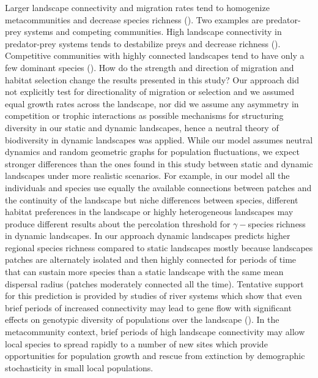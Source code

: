 \documentclass[12pt]{article}
\begin{document}
Larger landscape connectivity and migration rates tend to homogenize metacommunities and decrease species richness (\cite{ellneretal2001, foxetal2011}). Two examples are predator-prey systems and competing communities. High landscape connectivity in predator-prey systems tends to destabilize preys and decrease richness (\cite{ellneretal2001, foxetal2011}). Competitive communities with highly connected landscapes tend to have only a few dominant species (\cite{Holyoaketal2005}). How do the strength and direction of migration and habitat selection change the results presented in this study? Our approach did not explicitly test for directionality of migration or selection and we assumed equal growth rates across the landscape, nor did we assume any asymmetry in competition or trophic interactions as possible mechanisms for structuring diversity in our static and dynamic landscapes, hence a neutral theory of biodiversity in dynamic landscapes was applied. While our model assumes neutral dynamics and random geometric graphs for population fluctuations, we expect stronger differences than the ones found in this study between static and dynamic landscapes under more realistic scenarios. For example, in our model all the individuals and species use equally the available connections between patches and the continuity of the landscape but niche differences between species, different habitat preferences in the landscape or highly heterogeneous landscapes may produce different results about the percolation threshold for $\gamma-$species richness in dynamic landscapes. In our approach dynamic landscapes predicts higher regional species richness compared to static landscapes mostly because landscapes patches are alternately isolated and then highly connected for periods of time that can sustain more species than a static landscape with the same mean dispersal radius (patches moderately connected all the time). Tentative support for this prediction is provided by studies of river systems which show that even brief periods of increased connectivity may lead to gene flow with significant effects on genotypic diversity of populations over the landscape (\cite{BoizardEtAl2009}). In the metacommunity context, brief periods of high landscape connectivity may allow local species to spread rapidly to a number of new sites which provide opportunities for population growth and rescue from extinction by demographic stochasticity in small local populations. 
\end{document}
